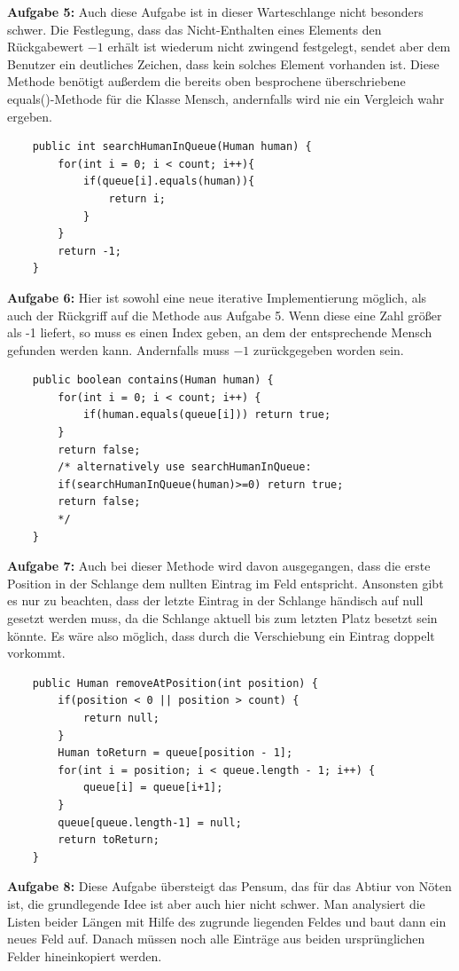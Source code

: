 \documentclass{article}
\begin{document}
\textbf{Aufgabe 5:}
Auch diese Aufgabe ist in dieser Warteschlange nicht besonders schwer. Die Festlegung, dass das Nicht-Enthalten eines Elements den Rückgabewert $-1$ erhält ist wiederum nicht zwingend festgelegt, sendet aber dem Benutzer ein deutliches Zeichen, dass kein solches Element vorhanden ist. Diese Methode benötigt außerdem die bereits oben besprochene überschriebene equals()-Methode für die Klasse Mensch, andernfalls wird nie ein Vergleich wahr ergeben. 
\begin{verbatim}
    public int searchHumanInQueue(Human human) {
        for(int i = 0; i < count; i++){
            if(queue[i].equals(human)){
                return i;
            }
        }
        return -1;
    }
\end{verbatim}
\textbf{Aufgabe 6:}
Hier ist sowohl eine neue iterative Implementierung möglich, als auch der Rückgriff auf die Methode aus Aufgabe 5. Wenn diese eine Zahl größer als -1 liefert, so muss es einen Index geben, an dem der entsprechende Mensch gefunden werden kann. Andernfalls muss $-1$ zurückgegeben worden sein. 
\begin{verbatim}
    public boolean contains(Human human) {
        for(int i = 0; i < count; i++) {
            if(human.equals(queue[i])) return true;
        }
        return false;
        /* alternatively use searchHumanInQueue:
        if(searchHumanInQueue(human)>=0) return true;
        return false;
        */
    }
\end{verbatim}
\textbf{Aufgabe 7:}
Auch bei dieser Methode wird davon ausgegangen, dass die erste Position in der Schlange dem nullten Eintrag im Feld entspricht. Ansonsten gibt es nur zu beachten, dass der letzte Eintrag in der Schlange händisch auf null gesetzt werden muss, da die Schlange aktuell bis zum letzten Platz besetzt sein könnte. Es wäre also möglich, dass durch die Verschiebung ein Eintrag doppelt vorkommt.
\begin{verbatim}
    public Human removeAtPosition(int position) {
        if(position < 0 || position > count) {
            return null;
        }
        Human toReturn = queue[position - 1];
        for(int i = position; i < queue.length - 1; i++) {
            queue[i] = queue[i+1];
        }
        queue[queue.length-1] = null;
        return toReturn;
    }
\end{verbatim}
\textbf{Aufgabe 8:}
Diese Aufgabe übersteigt das Pensum, das für das Abtiur von Nöten ist, die grundlegende Idee ist aber auch hier nicht schwer. Man analysiert die Listen beider Längen mit Hilfe des zugrunde liegenden Feldes und baut dann ein neues Feld auf. Danach müssen noch alle Einträge aus beiden ursprünglichen Felder hineinkopiert werden. \\
\end{document}
